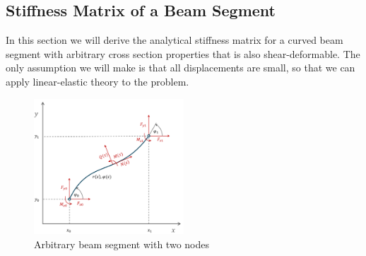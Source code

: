 %
%
%
%

\newpage
\subsection{Stiffness Matrix of a Beam Segment}

In this section we will derive the analytical stiffness matrix for a curved beam segment with arbitrary cross section properties that is also shear-deformable.
The only assumption we will make is that all displacements are small, so that we can apply linear-elastic theory to the problem.

\begin{figure}[h]
\centering
\includegraphics[width=0.5\textwidth]{figures/elements/beam-segment-linear}
\caption{Arbitrary beam segment with two nodes}
\label{fig:beam-segment-linear}
\end{figure}

